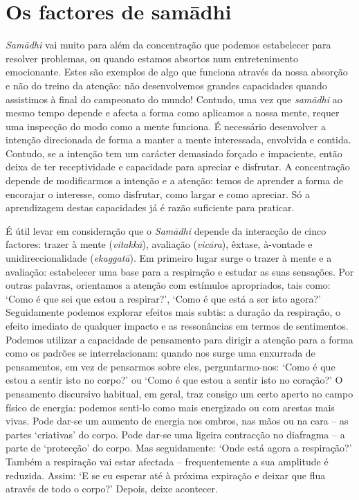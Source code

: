 \section{Os factores de samādhi}

\emph{Samādhi} vai muito para além da concentração que podemos estabelecer para resolver problemas, ou quando estamos absortos num entretenimento emocionante. Estes são exemplos de algo que funciona através da nossa absorção e não do treino da atenção: não desenvolvemos grandes capacidades quando assistimos à final do campeonato do mundo! Contudo, uma vez que \emph{samādhi} ao mesmo tempo depende e afecta a forma como aplicamos a nossa mente, requer uma inspecção do modo como a mente funciona. É necessário desenvolver a intenção direcionada de forma a manter a mente interessada, envolvida e contida. Contudo, se a intenção tem um carácter demasiado forçado e impaciente, então deixa de ter receptividade e capacidade para apreciar e disfrutar. A concentração depende de modificarmos a intenção e a atenção: temos de aprender a forma de encorajar o interesse, como disfrutar, como largar e como apreciar. Só a aprendizagem destas capacidades já é razão suficiente para praticar.

É útil levar em consideração que o \emph{Samādhi} depende da interacção de cinco factores: trazer à mente (\emph{vitakkā}), avaliação (\emph{vicāra}), êxtase, à-vontade e unidireccionalidade (\emph{ekaggatā}). Em primeiro lugar surge o trazer à mente e a avaliação: estabelecer uma base para a respiração e estudar as suas sensações. Por outras palavras, orientamos a atenção com estímulos apropriados, tais como: `Como é que sei que estou a respirar?', `Como é que está a ser isto agora?' Seguidamente podemos explorar efeitos mais subtis: a duração da respiração, o efeito imediato de qualquer impacto e as ressonâncias em termos de sentimentos. Podemos utilizar a capacidade de pensamento para dirigir a atenção para a forma como os padrões se interrelacionam: quando nos surge uma enxurrada de pensamentos, em vez de pensarmos sobre eles, perguntarmo-nos: `Como é que estou a sentir isto no corpo?' ou `Como é que estou a sentir isto no coração?' O pensamento discursivo habitual, em geral, traz consigo um certo aperto no campo físico de energia: podemos senti-lo como mais energizado ou com arestas mais vivas. Pode dar-se um aumento de energia nos ombros, nas mãos ou na cara -- as partes `criativas' do corpo. Pode dar-se uma ligeira contracção no diafragma -- a parte de `protecção' do corpo. Mas seguidamente: `Onde está agora a respiração?' Também a respiração vai estar afectada -- frequentemente a sua amplitude é reduzida. Assim: `E se eu esperar até à próxima expiração e deixar que flua através de todo o corpo?' Depois, deixe acontecer.

